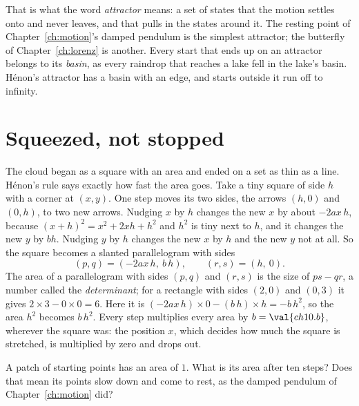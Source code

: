 That is what the word \emph{attractor} means: a set of states that the
motion settles onto and never leaves, and that pulls in the states around it.
The resting point of Chapter~\ref{ch:motion}'s damped pendulum is the
simplest attractor; the butterfly of Chapter~\ref{ch:lorenz} is another.
Every start that ends up on an attractor belongs to its \emph{basin}, as
every raindrop that reaches a lake fell in the lake's basin. Hénon's attractor has a basin with an edge, and starts outside
it run off to infinity.


\section{Squeezed, not stopped}
\label{sec:ch10-area}

\noindent
The cloud began as a square with an area and ended on a set as thin as a
line. Hénon's rule says exactly how fast the area goes. Take a tiny square of
side $h$ with a corner at $(x, y)$. One step moves its two sides, the arrows
$(h, 0)$ and $(0, h)$, to two new arrows. Nudging $x$ by $h$ changes the new
$x$ by about $-2ax\,h$, because $(x + h)^{2} = x^{2} + 2xh + h^{2}$ and
$h^{2}$ is tiny next to $h$, and it changes the new $y$ by $bh$. Nudging $y$
by $h$ changes the new $x$ by $h$ and the new $y$ not at all. So the square
becomes a slanted parallelogram with sides
\[ (p, q) = (-2ax\,h,\ b\,h), \qquad (r, s) = (h,\ 0). \]
The area of a parallelogram with sides $(p, q)$ and $(r, s)$ is the size of
$ps - qr$, a number called the \emph{determinant}; for a rectangle with sides
$(2, 0)$ and $(0, 3)$ it gives $2 \times 3 - 0 \times 0 = 6$. Here it is
$(-2ax\,h) \times 0 - (b\,h) \times h = -b\,h^{2}$, so the area $h^{2}$
becomes $b\,h^{2}$. Every step multiplies every area by $b = \val{ch10.b}$,
wherever the square was: the position $x$, which decides how much the square
is stretched, is multiplied by zero and drops out.

\begin{think}
A patch of starting points has an area of $1$. What is its area after ten
steps? Does that mean its points slow down and come to rest, as the damped
pendulum of Chapter~\ref{ch:motion} did?
\end{think}

